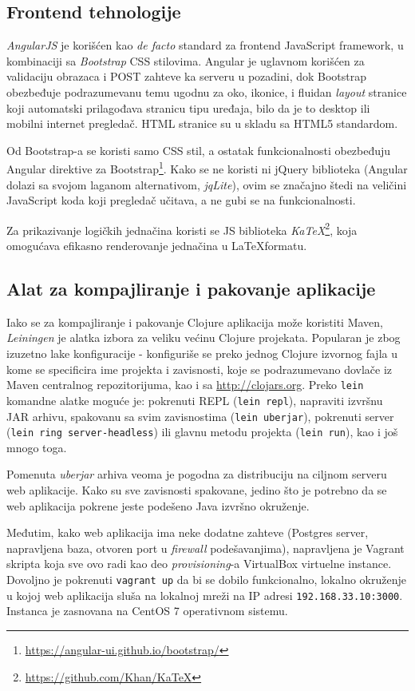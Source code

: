 \subsection{Frontend tehnologije}

\emph{AngularJS}\cite{angularjs} je korišćen kao \textit{de facto} standard za frontend JavaScript framework, u kombinaciji sa \emph{Bootstrap}\cite{bootstrap} CSS stilovima. Angular je uglavnom korišćen za validaciju obrazaca i POST zahteve ka serveru u pozadini, dok Bootstrap obezbeđuje podrazumevanu temu ugodnu za oko, ikonice, i fluidan \textit{layout} stranice koji automatski prilagođava stranicu tipu uređaja, bilo da je to desktop ili mobilni internet pregledač. HTML stranice su u skladu sa HTML5 standardom.

Od Bootstrap-a se koristi samo CSS stil, a ostatak funkcionalnosti obezbeđuju Angular direktive za Bootstrap\footnote{\url{https://angular-ui.github.io/bootstrap/}}. Kako se ne koristi ni jQuery biblioteka (Angular dolazi sa svojom laganom alternativom, \textit{jqLite}), ovim se značajno štedi na veličini JavaScript koda koji pregledač učitava, a ne gubi se na funkcionalnosti.

Za prikazivanje logičkih jednačina koristi se JS biblioteka \emph{KaTeX}\footnote{\url{https://github.com/Khan/KaTeX}}, koja omogućava efikasno renderovanje jednačina u \LaTeX formatu.

\subsection{Alat za kompajliranje i pakovanje aplikacije}

Iako se za kompajliranje i pakovanje Clojure aplikacija može koristiti Maven, \emph{Leiningen}\cite{leiningen} je alatka izbora za veliku većinu Clojure projekata. Popularan je zbog izuzetno lake konfiguracije - konfiguriše se preko jednog Clojure izvornog fajla u kome se specificira ime projekta i zavisnosti, koje se podrazumevano dovlače iz Maven centralnog repozitorijuma, kao i sa \url{http://clojars.org}. Preko \texttt{lein} komandne alatke moguće je: pokrenuti REPL (\texttt{lein repl}), napraviti izvršnu JAR arhivu, spakovanu sa svim zavisnostima (\texttt{lein uberjar}), pokrenuti server (\texttt{lein ring server-headless}) ili glavnu metodu projekta (\texttt{lein run}), kao i još mnogo toga.

Pomenuta \emph{uberjar} arhiva veoma je pogodna za distribuciju na ciljnom serveru web aplikacije. Kako su sve zavisnosti spakovane, jedino što je potrebno da se web aplikacija pokrene jeste podešeno Java izvršno okruženje.

Međutim, kako web aplikacija ima neke dodatne zahteve (Postgres server, napravljena baza, otvoren port u \textit{firewall} podešavanjima), napravljena je Vagrant skripta koja sve ovo radi kao deo \textit{provisioning}-a VirtualBox virtuelne instance. Dovoljno je pokrenuti \texttt{vagrant up} da bi se dobilo funkcionalno, lokalno okruženje u kojoj web aplikacija sluša na lokalnoj mreži na IP adresi \texttt{192.168.33.10:3000}. Instanca je zasnovana na CentOS 7 operativnom sistemu.